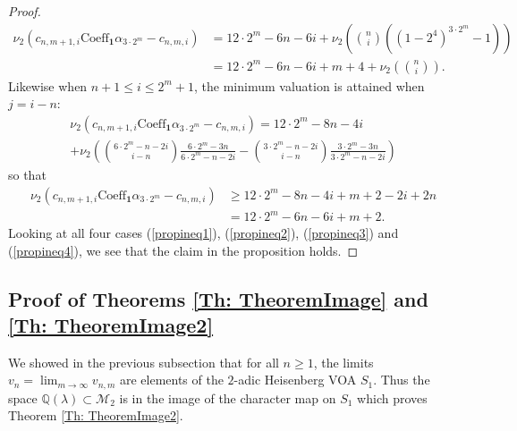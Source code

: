\documentclass[10pt,a4paper]{amsart}
\numberwithin{equation}{section}
\theoremstyle{definition}
\newcommand{\pHeis}{S_{1}}
\newcommand{\twomodforms}{\mathcal{M}_{2}}
\newcommand{\haupt}{\lambda}
\begin{document}
\begin{proof}
    \begin{align}
        \nu_{2} \left( c_{n,m+1,i} \text{Coeff}_{\textbf{1}} \alpha_{3 \cdot 2^{m}} - c_{n,m,i}  \right) &= 12 \cdot 2^{m}-6n-6i + \nu_{2} \left( \binom{n}{i} \left( (1-2^{4})^{3 \cdot 2^{m}} -1 \right) \right) \nonumber \\
        &= 12 \cdot 2^{m}-6n-6i + m+4 + \nu_{2} \left( \binom{n}{i} \right). \label{propineq3}
    \end{align}
    Likewise when $n+1 \leq i \leq 2^{m}+1$, the minimum valuation is attained when $j=i-n$:
    \begin{multline*}
        \nu_{2} \left( c_{n,m+1,i} \text{Coeff}_{\textbf{1}} \alpha_{3 \cdot 2^{m}} - c_{n,m,i}  \right) = 12 \cdot 2^{m}-8n-4i \\ + \nu_{2} \left( \binom{6 \cdot 2^{m} - n -2i}{i-n} \frac{6 \cdot 2^{m}-3n}{6 \cdot 2^{m}-n-2i} - \binom{3 \cdot 2^{m}-n-2i}{i-n} \frac{3 \cdot 2^{m}-3n}{3 \cdot 2^{m}-n-2i} \right)
    \end{multline*}
    so that
    \begin{align}
        \nu_{2} \left( c_{n,m+1,i} \text{Coeff}_{\textbf{1}} \alpha_{3 \cdot 2^{m}} - c_{n,m,i}  \right) &\geq 12 \cdot 2^{m}-8n-4i + m+2-2i+2n \nonumber \\
        &= 12 \cdot 2^{m}-6n-6i+m+2. \label{propineq4}
    \end{align}
  Looking at all four cases (\ref{propineq1}), (\ref{propineq2}), (\ref{propineq3}) and (\ref{propineq4}), we see that the claim in the proposition holds.
\end{proof}

\subsection{Proof of Theorems \ref{Th: TheoremImage} and \ref{Th: TheoremImage2}} \label{Subsection: OverconvergentImage}

We showed in the previous subsection that for all $n \geq 1$, the limits $v_{n} = \lim_{m \to \infty} v_{n,m}$ are elements of the $2$-adic Heisenberg VOA $\pHeis$. Thus the space $\mathbb{Q}( \haupt )\subset \twomodforms$ is in the image of the character map on $\pHeis$ which proves Theorem \ref{Th: TheoremImage2}.
\end{document}
